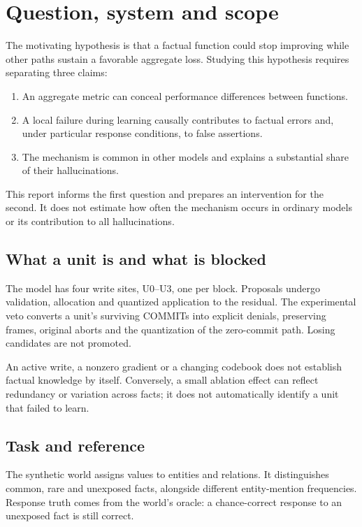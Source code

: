 \documentclass[11pt,a4paper]{article}
\newcommand{\pageend}{\clearpage}
\begin{document}
\pageend
\section{Question, system and scope}
\label{sec:scope}

The motivating hypothesis is that a factual function could stop improving
while other paths sustain a favorable aggregate loss. Studying this hypothesis
requires separating three claims:

\begin{enumerate}
\item An aggregate metric can conceal performance differences between functions.
\item A local failure during learning causally contributes to factual errors
and, under particular response conditions, to false assertions.
\item The mechanism is common in other models and explains a substantial share
of their hallucinations.
\end{enumerate}

This report informs the first question and prepares an intervention for the
second. It does not estimate how often the mechanism occurs in ordinary models
or its contribution to all hallucinations.

\subsection{What a unit is and what is blocked}
The model has four write sites, U0--U3, one per block. Proposals undergo
validation, allocation and quantized application to the residual. The
experimental veto converts a unit's surviving COMMITs into explicit denials,
preserving frames, original aborts and the quantization of the zero-commit
path. Losing candidates are not promoted.

An active write, a nonzero gradient or a changing codebook does not establish
factual knowledge by itself. Conversely, a small ablation effect can reflect
redundancy or variation across facts; it does not automatically identify a unit
that failed to learn.

\subsection{Task and reference}
The synthetic world assigns values to entities and relations. It distinguishes
common, rare and unexposed facts, alongside different entity-mention frequencies.
Response truth comes from the world's oracle: a chance-correct response to an
unexposed fact is still correct.
\end{document}
